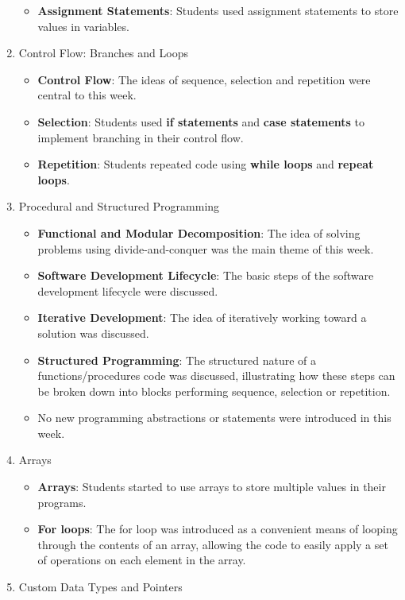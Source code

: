 \begin{enumerate}
\begin{itemize}[noitemsep,nolistsep]
  	\item \textbf{Assignment Statements}: Students used assignment statements to store values in variables. 
  \end{itemize}
  \item Control Flow: Branches and Loops
  \begin{itemize}[noitemsep,nolistsep]
  	\item \textbf{Control Flow}: The ideas of sequence, selection and repetition were central to this week.
  	\item \textbf{Selection}: Students used \textbf{if statements} and  \textbf{case statements} to implement branching in their control flow.
  	\item \textbf{Repetition}: Students repeated code using \textbf{while loops} and \textbf{repeat loops}.
  \end{itemize}
  \item Procedural and Structured Programming
  \begin{itemize}[noitemsep,nolistsep]
  	\item \textbf{Functional and Modular Decomposition}: The idea of solving problems using divide-and-conquer was the main theme of this week.
  	\item \textbf{Software Development Lifecycle}: The basic steps of the software development lifecycle were discussed.
  	\item \textbf{Iterative Development}: The idea of iteratively working toward a solution was discussed.
  	\item \textbf{Structured Programming}: The structured nature of a functions/procedures code was discussed, illustrating how these steps can be broken down into blocks performing sequence, selection or repetition.
  	\item No new programming abstractions or statements were introduced in this week.
  \end{itemize}
  \item Arrays
  \begin{itemize}[noitemsep,nolistsep]
  	\item \textbf{Arrays}: Students started to use arrays to store multiple values in their programs.
  	\item \textbf{For loops}: The for loop was introduced as a convenient means of looping through the contents of an array, allowing the code to easily apply a set of operations on each element in the array.
  \end{itemize}
  \item Custom Data Types and Pointers

\end{enumerate}
